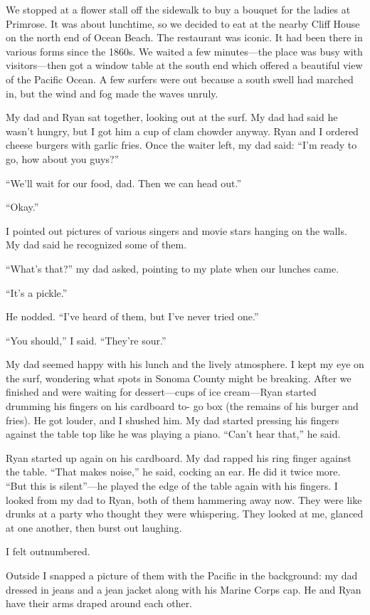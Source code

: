 \documentclass[12pt]{book}
\begin{document}
We stopped at a flower stall off the sidewalk to buy a bouquet for the ladies at Primrose. It was about lunchtime, so we decided to eat at the nearby Cliff House on the north end of Ocean Beach. The restaurant was iconic. It had been there in various forms since the 1860s. We waited a few minutes---the place was busy with visitors---then got a window table at the south end which offered a beautiful view of the Pacific Ocean. A few surfers were out because a south swell had marched in, but the wind and fog made the waves unruly.

My dad and Ryan sat together, looking out at the surf. My dad had said he wasn't hungry, but I got him a cup of clam chowder anyway. Ryan and I ordered cheese burgers with garlic fries. Once the waiter left, my dad said: ``I'm ready to go, how about you guys?''

``We'll wait for our food, dad. Then we can head out.''

``Okay.''

I pointed out pictures of various singers and movie stars hanging on the walls. My dad said he recognized some of them.

``What's that?'' my dad asked, pointing to my plate when our lunches came.

``It's a pickle.''

He nodded. ``I've heard of them, but I've never tried one.''

``You should,'' I said. ``They're sour.''

My dad seemed happy with his lunch and the lively atmosphere. I kept my eye on the surf, wondering what spots in Sonoma County might be breaking. After we finished and were waiting for dessert---cups of ice cream---Ryan started drumming his fingers on his cardboard to- go box (the remains of his burger and fries). He got louder, and I shushed him. My dad started pressing his fingers against the table top like he was playing a piano. ``Can't hear that,'' he said.

Ryan started up again on his cardboard. My dad rapped his ring finger against the table. ``That makes noise,'' he said, cocking an ear. He did it twice more. ``But this is silent''---he played the edge of the table again with his fingers. I looked from my dad to Ryan, both of them hammering away now. They were like drunks at a party who thought they were whispering. They looked at me, glanced at one another, then burst out laughing.

I felt outnumbered.

Outside I snapped a picture of them with the Pacific in the background: my dad dressed in jeans and a jean jacket along with his Marine Corps cap. He and Ryan have their arms draped around each other.
\end{document}
